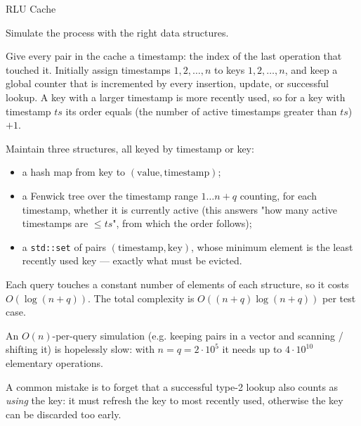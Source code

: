 \begin{tutorial}{RLU Cache}

Simulate the process with the right data structures.

Give every pair in the cache a timestamp: the index of the last operation that touched it. Initially assign timestamps $1, 2, \ldots, n$ to keys $1, 2, \ldots, n$, and keep a global counter that is incremented by every insertion, update, or successful lookup. A key with a larger timestamp is more recently used, so for a key with timestamp $ts$ its order equals (the number of active timestamps greater than $ts$) $+ 1$.

Maintain three structures, all keyed by timestamp or key:

\begin{itemize}
  \item a hash map from key to $(\text{value}, \text{timestamp})$;
  \item a Fenwick tree over the timestamp range $1 \ldots n+q$ counting, for each timestamp, whether it is currently active (this answers "how many active timestamps are $\le ts$", from which the order follows);
  \item a \texttt{std::set} of pairs $(\text{timestamp}, \text{key})$, whose minimum element is the least recently used key --- exactly what must be evicted.
\end{itemize}

Each query touches a constant number of elements of each structure, so it costs $O(\log(n+q))$. The total complexity is $O((n+q) \log (n+q))$ per test case.

An $O(n)$-per-query simulation (e.g. keeping pairs in a vector and scanning / shifting it) is hopelessly slow: with $n = q = 2 \cdot 10^5$ it needs up to $4 \cdot 10^{10}$ elementary operations.

A common mistake is to forget that a successful type-2 lookup also counts as \emph{using} the key: it must refresh the key to most recently used, otherwise the key can be discarded too early.


\end{tutorial}
